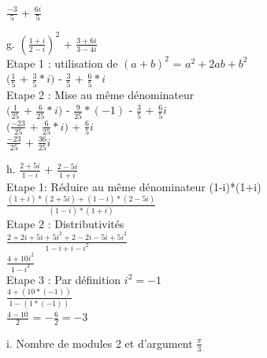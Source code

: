 $\frac{-3}{5}$ + $\frac{6i}{5}$ \\

\newpage

g. $(\frac{1+i}{2-i})^{2}$ + $\frac{3+6i}{3-4i}$ \\

Etape 1 : utilisation de $(a+b)^{2}$ = $a^{2}+2ab+b^{2}$ \\

$(\frac{1}{5}$ + $\frac{3}{5}*i)$ - $\frac{3}{5}$ + $\frac{6}{5}*i$ \\

Etape 2 : Mise au même dénominateur \\

$(\frac{1}{25}$ + $\frac{6}{25}*i)$ - $\frac{9}{25}*(-1)$ - $\frac{3}{5}$ + $\frac{6}{5}i$ \\

$(\frac{-23}{25}$ + $\frac{6}{25}*i)$ + $\frac{6}{5}i$ \\

$\frac{-23}{25}$ + $\frac{36}{25}i$ \\

\vspace{5mm} %

h. $\frac{2+5i}{1-i}$ + $\frac{2-5i}{1+i}$ \\

Etape 1: Réduire au même dénominateur (1-i)*(1+i) \\

$\frac{(1+i) * (2+5i) + (1-i) * (2-5i)}{ (1-i) * (1+i) }$ \\

Etape 2 : Distributivités \\

$\frac{2+2i+5i+5i^{2} + 2-2i-5i+5i^{2} }{1-i+i-i^{2}}$ \\

$\frac{4 + 10i^{2} }{1-i^{2}}$ \\

Etape 3 : Par définition $i^{2} = -1$ \\

$\frac{4 + (10*(-1)) }{1-(1*(-1))}$ \\

$\frac{4-10}{2}$ = $-\frac{6}{2} = -3$ \\

\vspace{5mm} %

i. Nombre de modules 2 et d'argument $\frac{\pi}{3}$ \\

